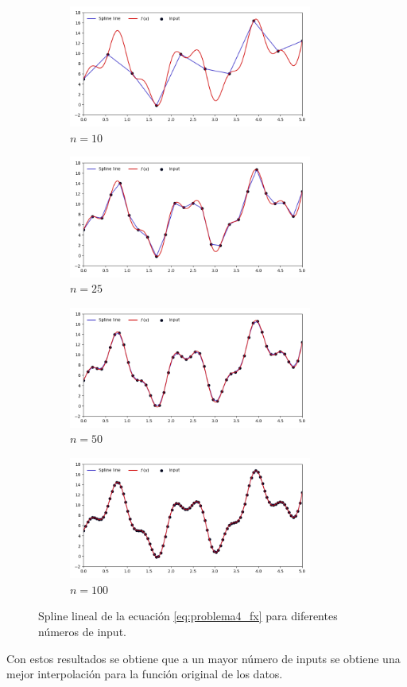 \begin{figure}[H]
    \centering
    \begin{subfigure}[b]{8cm}
        \includegraphics[width=8cm]{Graphics/problema3_10.png}
        \caption{$n=10$}
    \end{subfigure}
    \begin{subfigure}[b]{8cm}
        \includegraphics[width=8cm]{Graphics/problema3_25.png}
        \caption{$n=25$}
    \end{subfigure}
    \begin{subfigure}[b]{8cm}
        \includegraphics[width=8cm]{Graphics/problema3_50.png}
        \caption{$n=50$}
    \end{subfigure}
    \begin{subfigure}[b]{8cm}
        \includegraphics[width=8cm]{Graphics/problema3_100.png}
        \caption{$n=100$}
    \end{subfigure}
    \caption{Spline lineal de la ecuación \ref{eq:problema4_fx} para diferentes números de input.}
    \label{fig:problema4}
\end{figure}

Con estos resultados se obtiene que a un mayor número de inputs se obtiene una mejor interpolación para la función original de los datos.
\pagebreak